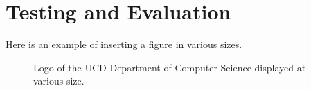 \documentclass[]{UCD_CS_47360_Report}
\begin{document}
\chapter{\label{chapter5} Testing and Evaluation}
Here is an example of inserting a figure in various sizes.
\begin{figure}[h]
\centering
\fboxsep 2mm
\caption{\label{fig:logo} Logo of the UCD Department of Computer Science displayed at various size.}
\end{figure}
\end{document}
